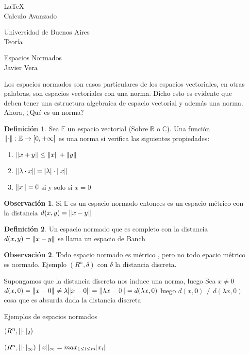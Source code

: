 \documentclass[12pt]{article}
\newcommand{\R}{\mathbb{R}}
\newcommand{\E}{\mathbb{E}}
\newcommand{\ra}{\rightarrow}
\DeclarePairedDelimiter{\norm}{\lVert}{\rVert}
\theoremstyle{definition}
\newtheorem{definition}{Definición}[section]
\newtheorem*{remark}{Observación}
\begin{document}
\LaTeX \\

Calculo Avanzado

Universidad de Buenos Aires\\

Teoría 

Espacios Normados\\

Javier Vera


\newpage

Los espacios normados son casos particulares de los espacios vectoriales, en otras palabras, son espacios vectoriales con una norma. Dicho esto es evidente que deben tener una estructura algebraica de espacio vectorial y además una norma.
Ahora, ¿Qué es un norma?

\begin{definition}
	Sea $\E$ un espacio vectorial (Sobre $\R$ o $\mathbb{C}$). Una función $\norm{\cdot}:\E \ra [0,+\infty]$ es una norma si verifica las siguientes propiedades:
	 \begin{enumerate}[(1)]
		\item $\norm{x+y} \leq \norm{x} + \norm{y}$
		
		\item $\norm{\lambda \cdot x} = |\lambda| \cdot \norm{x}$

		\item $\norm{x} = 0$ si y solo si $x=0$

	\end{enumerate}
\end{definition}

\begin{remark}
	Si $\E$ es un espacio normado entonces es un espacio métrico con la distancia $d(x,y) = \norm {x-y}$
\end{remark}

\begin{definition}
	Un espacio normado que es completo con la distancia $d(x,y) = \norm{x-y}$ se llama un espacio de Banch
\end{definition}

\begin{remark}
Todo espacio normado es métrico , pero no todo epacio métrico es normado. Ejemplo $(R^n,\delta)$ con $\delta$ la distancia discreta. 

	Supongamos que la distancia discreta nos induce una norma, luego Sea $x \neq 0$ $ d(x,0) = \norm{x-0} \neq \lambda \norm{x -0} = \norm {\lambda x - 0 } = d(\lambda x,0)$ luego $d(x,0) \neq d(\lambda x,0)$ cosa que es absurda dada la distancia discreta

	Ejemplos de espacios normados

	$(R^n,\norm {\cdot}_{2})$
	
	$(R^n,\norm {\cdot}_{\infty})$ $\norm{x}_{\infty} = max_{1 \leq i \leq m} |x_{i}| $
\end{remark}
\end{document}
